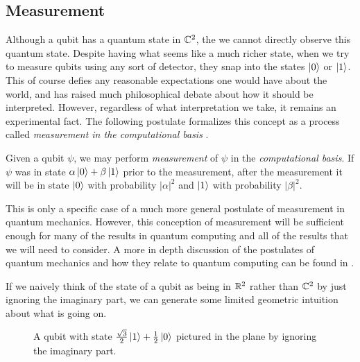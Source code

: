         
         \subsection{Measurement} 
         
         Although a qubit has a quantum state in $\mathbb{C}^2$, the we cannot directly observe this quantum state. Despite 
         having what seems like a much richer state, when we try to measure qubits using any sort of detector, they 
         snap into the states $\ket{0}$ or $\ket{1}$. This of course defies any reasonable expectations one would 
         have about the world, and has raised much philosophical debate about how it should be interpreted. 
         However, regardless of what interpretation we take, it remains an experimental fact. The following 
         postulate formalizes this concept as a process called \emph{measurement in the computational basis} .

         \begin{postulate}
             Given a qubit $\psi$, we may perform \emph{measurement} of $\psi$ in the \emph{computational basis}. 
             If $\psi$ was in state $\alpha \ket{0} + \beta \ket{1}$ prior to the measurement, after the 
             measurement it will be in state $\ket{0}$ with probability $|\alpha|^2$ and $ \ket{1}$ with 
             probability $|\beta|^2.$
     \end{postulate}

        This is only a specific case of a much more general postulate of measurement in quantum mechanics. However, 
        this conception of measurement will be sufficient enough for many of the results in quantum computing and 
        all of the results that we will need to consider. A more in depth discussion of the postulates of quantum 
        mechanics and how they relate to quantum computing can be found in \cite{Nielsen&Chuang}.
        
        If we naively think of the state of a qubit as being in $\mathbb{R}^2$ rather than $\mathbb{C}^2$ by just ignoring the 
        imaginary part, we can generate some limited geometric intuition about what is going on.


        \begin{figure}[ht]
            \centering
            \begin{center}
            \end{center}
            \caption{A qubit with state $\frac{\sqrt{3}}{2}\ket{1} + \frac{1}{2}\ket{0}$ pictured in the plane by 
            ignoring the imaginary part. }
    \end{figure}

